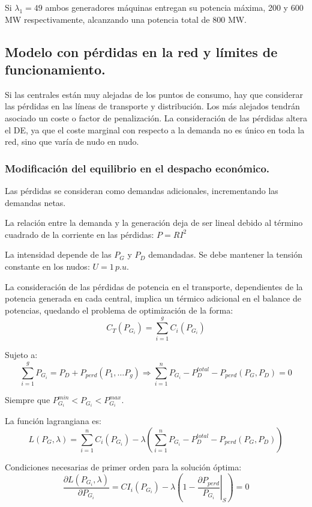 			
			Si $\lambda_1 = 49$ ambos generadores máquinas entregan su potencia máxima, 200 y 600 MW respectivamente, alcanzando una potencia total de 800 MW.
			
			
		\subsection{Modelo con pérdidas en la red y límites de funcionamiento.}
			Si las centrales están muy alejadas de los puntos de consumo, hay que considerar las
			pérdidas en las líneas de transporte y distribución. Los más alejados tendrán asociado un coste o factor de penalización. La consideración de las pérdidas altera el DE, ya que el coste marginal con respecto a la
			demanda no es único en toda la red, sino que varía de nudo en nudo.
			
			\subsubsection{Modificación del equilibrio en el despacho económico.}
				Las pérdidas se consideran como demandas adicionales, incrementando las demandas netas.
				
				
				La relación entre la demanda y la generación deja de ser lineal debido al término cuadrado de la corriente en las pérdidas: $P=RI^2$
				
				
				La intensidad depende de las $P_G$ y $P_D$ demandadas. Se debe mantener la tensión constante en los nudos: $U = 1\,p.u.$
				
				
				La consideración de las pérdidas de potencia en el transporte, dependientes de la potencia generada en cada central, implica un térmico adicional en el balance de potencias, quedando el problema de optimización de la forma:
				\[C_T(P_{G_i}) = \sum_{i=1}^{g} C_i(P_{G_i})\]
				
				
				Sujeto a:
				\[\sum_{i=1}^{g} P_{G_i} = P_D + P_{perd}(P_1,\dots P_g) \Rightarrow \sum_{i=1}^{n} P_{G_i} - P_D^{total} - P_{perd} (P_G, P_D) = 0\]
				
				
				Siempre que $P_{G_i}^{min} < P_{G_i} < P_{G_i}^{max}$.
				
				
				\vspace{0.25cm}
				La función lagrangiana es:
				\[L(P_G,\lambda) = \sum_{i=1}^{n} C_i(P_{G_i}) - \lambda \left(\sum_{i=1}^{n} P_{G_i} - P_D^{total} - P_{perd}(P_G, P_D)\right)\]
				
				
				Condiciones necesarias de primer orden para la solución óptima:
				\[\dfrac{\partial L(P_{G_i},\lambda)}{\partial P_{G_i}} = CI_i(P_{G_i})-\lambda \left(1-\left.\dfrac{\partial P_{perd}}{P_{G_i}}\right|_S\right) = 0\]
				
